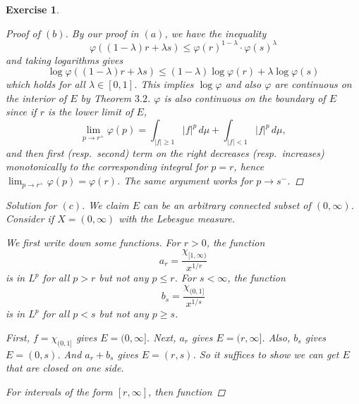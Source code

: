 \documentclass[10pt,letterpaper]{amsart}
\newtheorem{exercise}{Exercise}[section]
\theoremstyle{definition}
\theoremstyle{remark}
\numberwithin{equation}{exercise}
\begin{document}
\begin{multicols}{2}
\begin{exercise}
\begin{proof}[Proof of $(b)$]
      By our proof in $(a)$, we have the inequality
      \begin{equation*}
        \varphi((1-\lambda) r + \lambda s) \le \varphi(r)^{1-\lambda} \cdot \varphi(s)^{\lambda}
      \end{equation*}
      and taking logarithms gives
      \begin{equation*}
        \log \varphi((1-\lambda) r + \lambda s) \le (1-\lambda)\log \varphi(r) + \lambda \log \varphi(s)
      \end{equation*}
      which holds for all $\lambda \in [0,1]$. This implies $\log\varphi$ and
      also $\varphi$ are continuous on the interior of $E$ by Theorem $3.2$.
      $\varphi$ is also continuous on the boundary of $E$ since if $r$ is the
      lower limit of $E$,
      \begin{equation*}
        \lim_{p \to r^+} \varphi(p) = \int_{\lvert f \rvert \ge 1} \lvert f
        \rvert^p\,d\mu + \int_{\lvert f \rvert < 1} \lvert f
        \rvert^p\,d\mu,
      \end{equation*}
      and then first (resp.\ second) term on the right decreases (resp.\
      increases) monotonically to the corresponding integral for $p=r$, hence
      $\lim_{p \to r^+} \varphi(p) = \varphi(r)$. The same argument works for $p
      \to s^-$.
    \end{proof}
    \begin{proof}[Solution for $(c)$]
      We claim $E$ can be an arbitrary connected subset of $(0,\infty)$.
      Consider if $X = (0,\infty)$ with the Lebesgue measure.
      \par We first write down some functions. For $r > 0$, the function
      \begin{equation*}
        a_r = \frac{\chi_{[1,\infty)}}{x^{1/r}}
      \end{equation*}
      is in $L^p$ for all $p > r$ but not any $p \le r$. For $s < \infty$, the
      function
      \begin{equation*}
        b_s = \frac{\chi_{(0,1]}}{x^{1/s}}
      \end{equation*}
      is in $L^p$ for all $p < s$ but not any $p \ge s$.
      \par First, $f = \chi_{(0,1]}$ gives $E = (0,\infty]$. Next, $a_r$ gives
      $E = (r,\infty]$. Also, $b_s$ gives $E = (0,s)$. And $a_r + b_s$ gives $E
      = (r,s)$. So it suffices to show we can get $E$ that are closed on one
      side.
      \par For intervals of the form $[r,\infty]$, then function

\end{proof}
\end{exercise}
\end{multicols}
\end{document}
